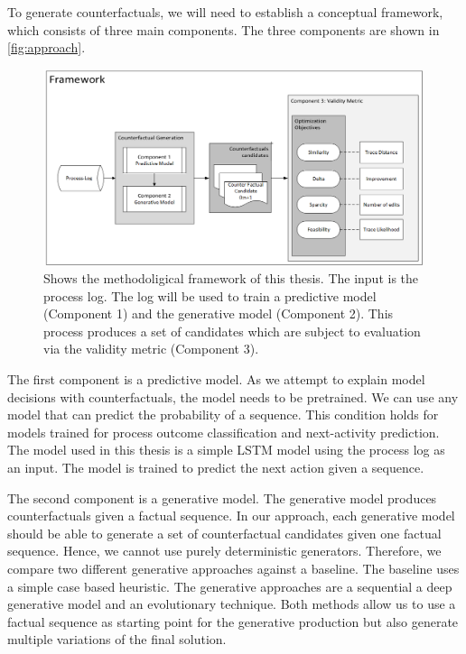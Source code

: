 \documentclass[./../../paper.tex]{subfiles}
\begin{document}
To generate counterfactuals, we will need to establish a conceptual framework, which consists of three main components. The three components are shown in \autoref{fig:approach}. 

\begin{figure}[htb]
    \centering
    \includegraphics[width=0.99\textwidth]{figures/framework.png}
    \caption{Shows the methodoligical framework of this thesis. The input is the process log. The log will be used to train a predictive model (Component 1) and the generative model (Component 2). This process produces a set of candidates which are subject to evaluation via the validity metric (Component 3).}
    \label{fig:approach}
\end{figure}

The first component is a predictive model. As we attempt to explain model decisions with counterfactuals, the model needs to be pretrained. We can use any model that can predict the probability of a sequence. This condition holds for models trained for process outcome classification and next-activity prediction. The model used in this thesis is a simple LSTM model using the process log as an input. The model is trained to predict the next action given a sequence. 

The second component is a generative model. The generative model produces counterfactuals given a factual sequence. In our approach, each generative model should be able to generate a set of counterfactual candidates given one factual sequence. Hence, we cannot use purely deterministic generators. Therefore, we compare two different generative approaches against a baseline. The baseline uses a simple case based heuristic. The  generative approaches are a sequential a deep generative model and an evolutionary technique. Both methods allow us to use a factual sequence as starting point for the generative production but also generate multiple variations of the final solution. 
\end{document}
